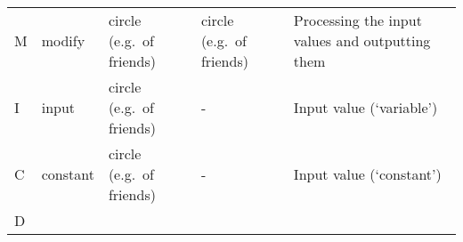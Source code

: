 \begin{longtable}[]{@{}lllll@{}}
\begin{minipage}[t]{0.17\columnwidth}
M\strut
\end{minipage} & \begin{minipage}[t]{0.17\columnwidth}\raggedright
modify\strut
\end{minipage} & \begin{minipage}[t]{0.17\columnwidth}\raggedright
circle (e.g.~of friends)\strut
\end{minipage} & \begin{minipage}[t]{0.17\columnwidth}\raggedright
circle (e.g.~of friends)\strut
\end{minipage} & \begin{minipage}[t]{0.17\columnwidth}\raggedright
Processing the input values and outputting them\strut
\end{minipage}\tabularnewline
\begin{minipage}[t]{0.17\columnwidth}\raggedright
I\strut
\end{minipage} & \begin{minipage}[t]{0.17\columnwidth}\raggedright
input\strut
\end{minipage} & \begin{minipage}[t]{0.17\columnwidth}\raggedright
circle (e.g.~of friends)\strut
\end{minipage} & \begin{minipage}[t]{0.17\columnwidth}\raggedright
-\strut
\end{minipage} & \begin{minipage}[t]{0.17\columnwidth}\raggedright
Input value (`variable')\strut
\end{minipage}\tabularnewline
\begin{minipage}[t]{0.17\columnwidth}\raggedright
C\strut
\end{minipage} & \begin{minipage}[t]{0.17\columnwidth}\raggedright
constant\strut
\end{minipage} & \begin{minipage}[t]{0.17\columnwidth}\raggedright
circle (e.g.~of friends)\strut
\end{minipage} & \begin{minipage}[t]{0.17\columnwidth}\raggedright
-\strut
\end{minipage} & \begin{minipage}[t]{0.17\columnwidth}\raggedright
Input value (`constant')\strut
\end{minipage}\tabularnewline
\begin{minipage}[t]{0.17\columnwidth}\raggedright
D\strut
\end{minipage} & \begin{minipage}[t]{0.17\columnwidth}\raggedright

\end{minipage}
\end{longtable}

